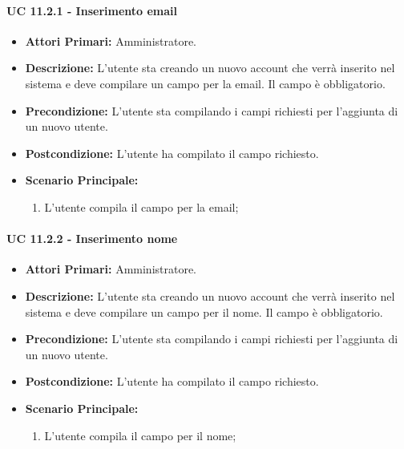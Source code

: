 			\paragraph{UC 11.2.1 - Inserimento email}
			\begin{itemize}
				\item \textbf{Attori Primari:} Amministratore.
				\item \textbf{Descrizione:} L'utente sta creando un nuovo account che verrà inserito nel sistema e deve compilare un campo per la email. Il campo è obbligatorio.
				\item \textbf{Precondizione:} L'utente sta compilando i campi richiesti per l'aggiunta di un nuovo utente.
				\item \textbf{Postcondizione:} L'utente ha compilato il campo richiesto.
				\item \textbf{Scenario Principale:}
				\begin{enumerate}
					\item{L'utente compila il campo per la email;}
				\end{enumerate}	
			\end{itemize}

			\paragraph{UC 11.2.2 - Inserimento nome}
			\begin{itemize}
				\item \textbf{Attori Primari:} Amministratore.
				\item \textbf{Descrizione:} L'utente sta creando un nuovo account che verrà inserito nel sistema e deve compilare un campo per il nome. Il campo è obbligatorio.
				\item \textbf{Precondizione:} L'utente sta compilando i campi richiesti per l'aggiunta di un nuovo utente.
				\item \textbf{Postcondizione:} L'utente ha compilato il campo richiesto.
				\item \textbf{Scenario Principale:}
				\begin{enumerate}
					\item{L'utente compila il campo per il nome;}
				\end{enumerate}	
			\end{itemize}

